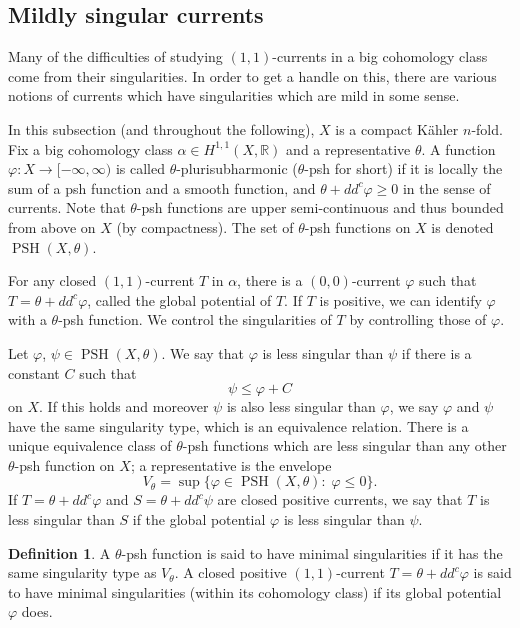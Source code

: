 \documentclass[a4paper]{amsart}
\newcommand{\R}{\mathbb{R}}
\newcommand{\PSH}{\operatorname{PSH}}
\theoremstyle{definition}
\newtheorem{definition}[theorem]{Definition}
\begin{document}
\subsection{Mildly singular currents}\label{sec: singcurrents}
Many of the difficulties of studying $(1, 1)$-currents in a big cohomology class come from their singularities. In order to get a handle on this, there are various notions of currents which have singularities which are mild in some sense. 

In this subsection (and throughout the following), $X$ is a compact K\"ahler $n$-fold. Fix a big cohomology class $\alpha \in H^{1, 1}(X, \R)$ and a representative $\theta$. A function $\varphi: X \to [-\infty, \infty)$ is called $\theta$-plurisubharmonic ($\theta$-psh for short) if it is locally the sum of a psh function and a smooth function, and $\theta + dd^c\varphi \ge 0$ in the sense of currents. Note that $\theta$-psh functions are upper semi-continuous and thus bounded from above on $X$ (by compactness). The set of $\theta$-psh functions on $X$ is denoted $\PSH(X, \theta)$.

For any closed $(1, 1)$-current $T$ in $\alpha$, there is a $(0, 0)$-current $\varphi$ such that $T = \theta + dd^c\varphi$, called the global potential of $T$. If $T$ is positive, we can identify $\varphi$ with a $\theta$-psh function. We control the singularities of $T$ by controlling those of $\varphi$.

Let $\varphi$, $\psi \in \PSH(X, \theta)$. We say that $\varphi$ is less singular than $\psi$ if there is a constant $C$ such that
\[\psi \le \varphi + C\]
on $X$. If this holds and moreover $\psi$ is also less singular than $\varphi$, we say $\varphi$ and $\psi$ have the same singularity type, which is an equivalence relation. There is a unique equivalence class of $\theta$-psh functions which are less singular than any other $\theta$-psh function on $X$; a representative is the envelope
\[V_\theta = \sup \{\varphi \in \PSH(X, \theta) :\; \varphi \le 0\}.\]
If $T = \theta + dd^c\varphi$ and $S = \theta + dd^c\psi$ are closed positive currents, we say that $T$ is less singular than $S$ if the global potential $\varphi$ is less singular than $\psi$.
\begin{definition}
	A $\theta$-psh function is said to have minimal singularities if it has the same singularity type as $V_\theta$. A closed positive $(1, 1)$-current $T = \theta + dd^c\varphi$ is said to have minimal singularities (within its cohomology class) if its global potential $\varphi$ does.
\end{definition}
\end{document}
